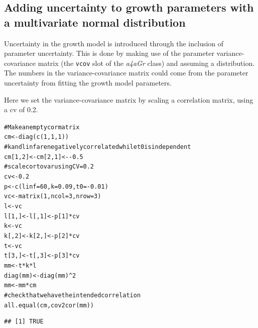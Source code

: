 \documentclass[a4paper,english,10pt]{article}\usepackage[]{graphicx}\usepackage[]{color}
\makeatletter
\newcommand{\hlnum}[1]{\textcolor[rgb]{0.2,0.2,0.2}{#1}}%
\newcommand{\hlcom}[1]{\textcolor[rgb]{0.2,0.267,0.4}{#1}}%
\newcommand{\hlopt}[1]{\textcolor[rgb]{0.2,0.2,0.2}{#1}}%
\newcommand{\hlstd}[1]{\textcolor[rgb]{0,0,0}{#1}}%
\newcommand{\hlkwb}[1]{\textcolor[rgb]{0.361,0.506,0.596}{#1}}%
\newcommand{\hlkwc}[1]{\textcolor[rgb]{0.361,0.506,0.596}{#1}}%
\newcommand{\hlkwd}[1]{\textcolor[rgb]{0.361,0.506,0.596}{#1}}%
\newenvironment{kframe}{%
 \def\at@end@of@kframe{}%
 \ifinner\ifhmode%
  \def\at@end@of@kframe{\end{minipage}}%
  \begin{minipage}{\columnwidth}%
 \fi\fi%
 \def\FrameCommand##1{\hskip\@totalleftmargin \hskip-\fboxsep
 \colorbox{shadecolor}{##1}\hskip-\fboxsep
     \hskip-\linewidth \hskip-\@totalleftmargin \hskip\columnwidth}%
 \MakeFramed {\advance\hsize-\width
   \@totalleftmargin\z@ \linewidth\hsize
   \@setminipage}}%
 {\par\unskip\endMakeFramed%
 \at@end@of@kframe}
\newenvironment{knitrout}{}{} %
\newcommand{\code}[1]{{\texttt{#1}}}
\newcommand{\class}[1]{{\textit{#1}}}
\makeatother
\begin{document}
\subsection{Adding uncertainty to growth parameters with a multivariate normal distribution}

Uncertainty in the growth model is introduced through the inclusion of parameter uncertainty.
This is done by making use of the parameter variance-covariance matrix (the \code{vcov} slot of the \class{a4aGr} class) and assuming a distribution. The numbers in the variance-covariance matrix could come from the parameter uncertainty from fitting the growth model parameters.

Here we set the variance-covariance matrix by scaling a correlation matrix, using a cv of 0.2.

\begin{knitrout}
\color{fgcolor}\begin{kframe}
\begin{alltt}
\hlcom{# Make an empty cor matrix}
\hlstd{cm} \hlkwb{<-} \hlkwd{diag}\hlstd{(}\hlkwd{c}\hlstd{(}\hlnum{1}\hlstd{,}\hlnum{1}\hlstd{,}\hlnum{1}\hlstd{))}
\hlcom{# k and linf are negatively correlated while t0 is independent}
\hlstd{cm[}\hlnum{1}\hlstd{,}\hlnum{2}\hlstd{]} \hlkwb{<-} \hlstd{cm[}\hlnum{2}\hlstd{,}\hlnum{1}\hlstd{]} \hlkwb{<-} \hlopt{-}\hlnum{0.5}
\hlcom{# scale cor to var using CV=0.2}
\hlstd{cv} \hlkwb{<-} \hlnum{0.2}
\hlstd{p} \hlkwb{<-} \hlkwd{c}\hlstd{(}\hlkwc{linf}\hlstd{=}\hlnum{60}\hlstd{,} \hlkwc{k}\hlstd{=}\hlnum{0.09}\hlstd{,} \hlkwc{t0}\hlstd{=}\hlopt{-}\hlnum{0.01}\hlstd{)}
\hlstd{vc} \hlkwb{<-} \hlkwd{matrix}\hlstd{(}\hlnum{1}\hlstd{,} \hlkwc{ncol}\hlstd{=}\hlnum{3}\hlstd{,} \hlkwc{nrow}\hlstd{=}\hlnum{3}\hlstd{)}
\hlstd{l} \hlkwb{<-} \hlstd{vc}
\hlstd{l[}\hlnum{1}\hlstd{,]} \hlkwb{<-} \hlstd{l[,}\hlnum{1}\hlstd{]} \hlkwb{<-} \hlstd{p[}\hlnum{1}\hlstd{]}\hlopt{*}\hlstd{cv}
\hlstd{k} \hlkwb{<-} \hlstd{vc}
\hlstd{k[,}\hlnum{2}\hlstd{]} \hlkwb{<-} \hlstd{k[}\hlnum{2}\hlstd{,]} \hlkwb{<-} \hlstd{p[}\hlnum{2}\hlstd{]}\hlopt{*}\hlstd{cv}
\hlstd{t} \hlkwb{<-} \hlstd{vc}
\hlstd{t[}\hlnum{3}\hlstd{,]} \hlkwb{<-} \hlstd{t[,}\hlnum{3}\hlstd{]} \hlkwb{<-} \hlstd{p[}\hlnum{3}\hlstd{]}\hlopt{*}\hlstd{cv}
\hlstd{mm} \hlkwb{<-} \hlstd{t}\hlopt{*}\hlstd{k}\hlopt{*}\hlstd{l}
\hlkwd{diag}\hlstd{(mm)} \hlkwb{<-} \hlkwd{diag}\hlstd{(mm)}\hlopt{^}\hlnum{2}
\hlstd{mm} \hlkwb{<-} \hlstd{mm}\hlopt{*}\hlstd{cm}
\hlcom{# check that we have the intended correlation}
\hlkwd{all.equal}\hlstd{(cm,} \hlkwd{cov2cor}\hlstd{(mm))}
\end{alltt}
\begin{verbatim}
## [1] TRUE
\end{verbatim}
\end{kframe}
\end{knitrout}
\end{document}
